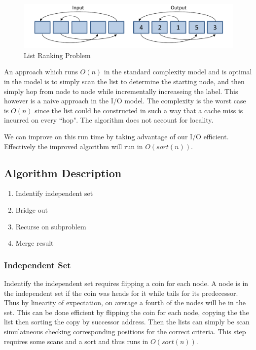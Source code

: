 \documentclass[11pt]{article}
\begin{document}
\begin{figure}[H]  
\includegraphics[scale=0.5]{figures/listrankingio.pdf}
\caption{List Ranking Problem}
\label{listrankingio}
\end{figure}

An approach which runs $O(n)$ in the standard complexity model and is optimal in the model is to simply scan the list to determine the 
starting node, and then simply hop from node to node while incrementally increaseing the label.  This however is a naive approach in 
the I/O model.  The complexity is the worst case is $O(n)$ since the list could be constructed in such a way that a cache miss is incurred on 
every ``hop".  The algorithm does not account for locality.  

We can improve on this run time by taking advantage of our I/O efficient.  Effectively the improved algorithm will run in $O(sort(n))$. 

\subsection{Algorithm Description}


\begin{enumerate}
  \item Indentify independent set
  \item Bridge out
  \item Recurse on subproblem
  \item Merge result
\end{enumerate}

\subsubsection{Independent Set}
Indentify the independent set requires flipping a coin for each node.  A node is in the independent set if the coin was heads for 
it while tails for its predecessor. Thus by linearity of expectation, on average a fourth of the nodes will be in the set. 
This can be done efficient by flipping the coin for each node, copying the the list then sorting the copy 
by successor address. Then the lists can simply be scan simulatneous checking corresponding positions for the correct criteria.  This step 
requires some scans and a sort and thus runs in $O(sort(n))$. 
\end{document}
